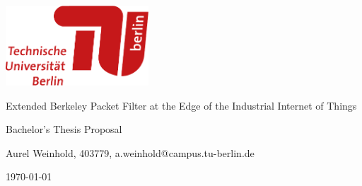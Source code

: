 \documentclass[11pt, a4paper]{scrartcl}
\begin{document}
\begin{title}

    \begin{center}
        \includegraphics[width=0.4\textwidth]{tu_logo.pdf}

        \vspace*{2em}
        \LARGE
        Extended Berkeley Packet Filter at the Edge of the Industrial Internet
        of Things

        \vspace*{1em}
        \small
        Bachelor's Thesis Proposal

        \vspace*{1em}
        Aurel Weinhold, 403779, a.weinhold@campus.tu-berlin.de

        \vspace*{1em}
        \today

    \end{center}

\end{title}







\printbibliography
\end{document}
